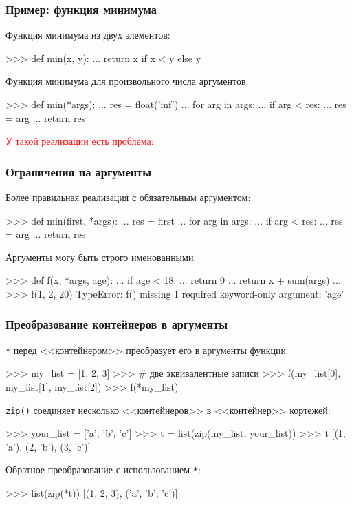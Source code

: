\documentclass[fleqn, xcolor=x11names, 11pt]{beamer}
\begin{document}
\begin{frame}[fragile]\frametitle{Пример: функция минимума}

Функция минимума из двух элементов:
\begin{pcode}

>>> def min(x, y):
...     return x if x < y else y
\end{pcode}

\hfill

Функция минимума для произвольного числа аргументов:
\begin{pcode}
>>> def min(*args):
...     res = float('inf')
...     for arg in args:
...         if arg < res:
...             res = arg
...     return res
\end{pcode}

\hfill

\textcolor{red}{У такой реализации есть проблема:}
\end{frame}

\begin{frame}[fragile]\frametitle{Ограничения на аргументы}

Более правильная реализация с обязательным аргументом:
\begin{pcode}
>>> def min(first, *args):
...     res = first
...     for arg in args:
...         if arg < res:
...             res = arg
...     return res
\end{pcode}

Аргументы могу быть строго именованными:
\begin{pcode}
>>> def f(x, *args, age):
...    if age < 18:
...        return 0
...    return x + sum(args) 
...
>>> f(1, 2, 20)
TypeError:
f() missing 1 required keyword-only argument: 'age'
\end{pcode}

\end{frame}

\begin{frame}[fragile]\frametitle{Преобразование контейнеров в аргументы}
\texttt{*} перед <<контейнером>> преобразует его в аргументы функции
\begin{pcode}
>>> my_list = [1, 2, 3]
>>> # две эквивалентные записи
>>> f(my_list[0], my_list[1], my_list[2])
>>> f(*my_list)
\end{pcode} 

\hfill

\texttt{zip()} соединяет несколько <<контейнеров>> в <<контейнер>> кортежей:
\begin{pcode}
>>> your_list = ['a', 'b', 'c']
>>> t = list(zip(my_list, your_list))
>>> t
[(1, 'a'), (2, 'b'), (3, 'c')]
\end{pcode} 

\hfill

Обратное преобразование с использованием \texttt{*}:
\begin{pcode}
>>> list(zip(*t))
[(1, 2, 3), ('a', 'b', 'c')]
\end{pcode} 

\end{frame}
\end{document}
